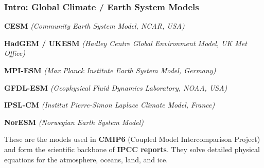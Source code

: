 \documentclass[xcolor=x11names,compress,aspectratio=169]{beamer}%
\makeatletter
\newif\ifshowslide
\renewenvironment{itemize}{\begin{compactitemize}[<+-| alert@+>]}{\end{compactitemize}}
\makeatother
\begin{document}
\ifshowslide
%

\begin{frame}%
%

\frametitle{Intro: Global Climate / Earth System Models}%


\begin{itemize}
\item \textbf{CESM} \textit{(Community Earth System Model, NCAR, USA)}

\item \textbf{HadGEM / UKESM} \textit{(Hadley Centre Global Environment Model,
UK Met Office)}

\item \textbf{MPI-ESM} \textit{(Max Planck Institute Earth System Model,
Germany)}

\item \textbf{GFDL-ESM} \textit{(Geophysical Fluid Dynamics Laboratory, NOAA,
USA)}

\item \textbf{IPSL-CM} \textit{(Institut Pierre-Simon Laplace Climate Model,
France)}

\item \textbf{NorESM} \textit{(Norwegian Earth System Model)}
\end{itemize}

\vspace{0.3cm} These are the models used in \textbf{CMIP6} (Coupled Model
Intercomparison Project) and form the scientific backbone of \textbf{IPCC
reports}. They solve detailed physical equations for the atmosphere, oceans,
land, and ice.%

\transboxout
\end{frame}%
%
\end{document}
